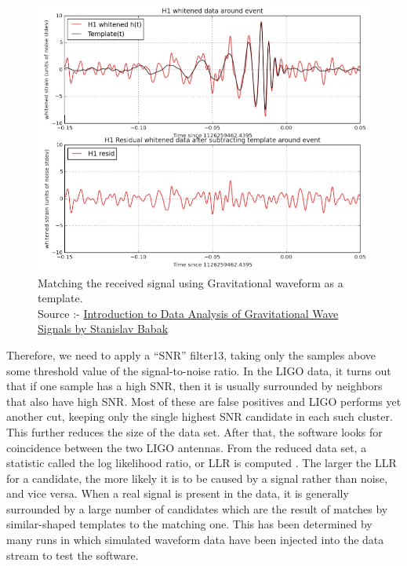 \begin{figure}[h]
    \centering
    \includegraphics[scale=0.92]{images.tex/template_matching.jpg}
    \caption{Matching the received signal using Gravitational waveform as a template.\\ Source :- \href{https://kiss.caltech.edu/workshops/LISA/presentations/Babak.pdf}{Introduction to Data Analysis of Gravitational Wave Signals by Stanislav Babak}}
\end{figure}

Therefore, we need to apply a “SNR” filter13, taking only the samples above some threshold value of the signal-to-noise ratio. In the LIGO data, it turns out that if one sample has a high SNR, then it is usually surrounded by neighbors that also have high SNR. Most of these are false positives and LIGO performs yet another cut, keeping only the single highest SNR candidate in each such cluster. This further reduces the size of the data set. After that, the software looks for coincidence between the two LIGO antennas. From the reduced data set, a statistic called the log likelihood ratio, or LLR is computed . The larger the LLR for a candidate, the more likely it is to be caused by a signal rather than noise, and vice versa. When a real signal is present in the data, it is generally surrounded by a large number of candidates which are the result of matches by similar-shaped templates to the matching one. This has been determined by many runs in which simulated waveform data have been injected into the data stream to test the software. \\

